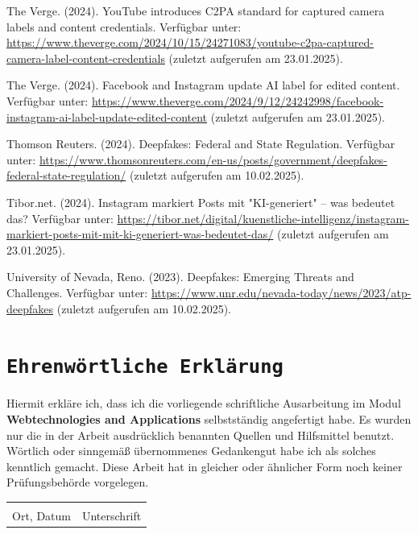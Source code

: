 \documentclass[a4paper,12pt]{article}
\begin{document}
\begin{thebibliography}{99}
 The Verge. (2024). YouTube introduces C2PA standard for captured camera labels and content credentials. 
Verfügbar unter: \url{https://www.theverge.com/2024/10/15/24271083/youtube-c2pa-captured-camera-label-content-credentials} (zuletzt aufgerufen am 23.01.2025).

 The Verge. (2024). Facebook and Instagram update AI label for edited content. 
Verfügbar unter: \url{https://www.theverge.com/2024/9/12/24242998/facebook-instagram-ai-label-update-edited-content} (zuletzt aufgerufen am 23.01.2025).

 Thomson Reuters. (2024). Deepfakes: Federal and State Regulation.  
Verfügbar unter: \url{https://www.thomsonreuters.com/en-us/posts/government/deepfakes-federal-state-regulation/} (zuletzt aufgerufen am 10.02.2025).

 Tibor.net. (2024). Instagram markiert Posts mit "KI-generiert" – was bedeutet das? 
Verfügbar unter: \url{https://tibor.net/digital/kuenstliche-intelligenz/instagram-markiert-posts-mit-mit-ki-generiert-was-bedeutet-das/} (zuletzt aufgerufen am 23.01.2025).

 University of Nevada, Reno. (2023). Deepfakes: Emerging Threats and Challenges.
Verfügbar unter: \url{https://www.unr.edu/nevada-today/news/2023/atp-deepfakes} (zuletzt aufgerufen am 10.02.2025).
\end{thebibliography}
\newpage

\newpage
{}
\section*{\texttt{Ehrenwörtliche Erklärung}}
Hiermit erkläre ich, dass ich die vorliegende schriftliche Ausarbeitung im Modul \textbf{Webtechnologies and Applications} selbstständig
angefertigt habe. Es wurden nur die in der Arbeit ausdrücklich benannten Quellen und
Hilfsmittel benutzt. Wörtlich oder sinngemäß übernommenes Gedankengut habe ich als
solches kenntlich gemacht. Diese Arbeit hat in gleicher oder ähnlicher Form noch keiner
Prüfungsbehörde vorgelegen.

\vspace{3cm}
\noindent\begin{tabular}{p{}p{}}
    \hrulefill & \hrulefill \\
    Ort, Datum & Unterschrift \\
\end{tabular}
\end{document}
